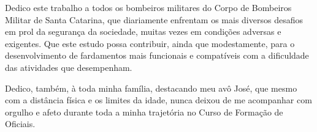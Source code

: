Dedico este trabalho a todos os bombeiros militares do Corpo de Bombeiros Militar de Santa Catarina, que diariamente enfrentam os mais diversos desafios em prol da segurança da sociedade, muitas vezes em condições adversas e exigentes. Que este estudo possa contribuir, ainda que modestamente, para o desenvolvimento de fardamentos mais funcionais e compatíveis com a dificuldade das atividades que desempenham.

Dedico, também, à toda minha família, destacando meu avô José, que mesmo com a distância física e os limites da idade, nunca deixou de me acompanhar com orgulho e afeto durante toda a minha trajetória no Curso de Formação de Oficiais.